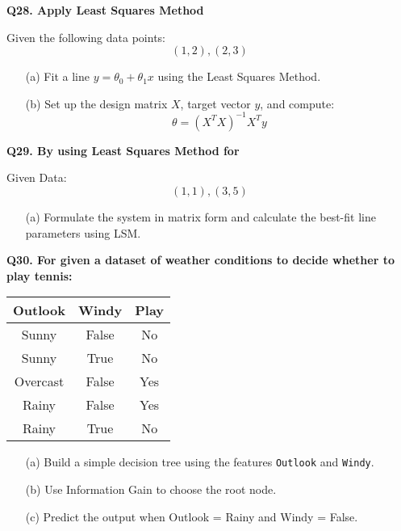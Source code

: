 \documentclass{article}
\begin{document}
\vspace{1\baselineskip}

\textbf{Q28. Apply Least Squares Method}

Given the following data points:  
\[
(1, 2), (2, 3)
\]

\begin{itemize}
    \item[(a)] Fit a line \( y = \theta_0 + \theta_1 x \) using the Least Squares Method.
    \item[(b)] Set up the design matrix \( X \), target vector \( y \), and compute:
    \[
    \theta = (X^T X)^{-1} X^T y
    \]
\end{itemize}

\vspace{0.5cm}

\textbf{Q29. By using Least Squares Method for}

Given Data:
\[
(1, 1), (3, 5)
\]

\begin{itemize}
    \item[(a)] Formulate the system in matrix form and calculate the best-fit line parameters using LSM.
\end{itemize}


\vspace{1\baselineskip}

\textbf{Q30. For given a dataset of weather conditions to decide whether to play tennis: }


\begin{tabular}{|c|c|c|}
\hline
Outlook & Windy & Play \\
\hline
Sunny   & False & No \\
Sunny   & True  & No \\
Overcast & False & Yes \\
Rainy   & False & Yes \\
Rainy   & True  & No \\
\hline
\end{tabular}

\begin{itemize}
    \item[(a)] Build a simple decision tree using the features \texttt{Outlook} and \texttt{Windy}.
    \item[(b)] Use Information Gain to choose the root node.
    \item[(c)] Predict the output when Outlook = Rainy and Windy = False.
\end{itemize}
\end{document}
